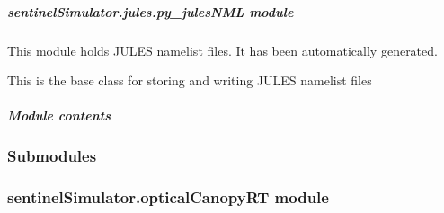 \documentclass[letterpaper,10pt,english]{sphinxmanual}
\begin{document}
\subparagraph{sentinelSimulator.jules.py\_julesNML module}
\label{source/sentinelSimulator.jules:module-sentinelSimulator.jules.py_julesNML}\label{source/sentinelSimulator.jules:sentinelsimulator-jules-py-julesnml-module}
This module holds JULES namelist files. 
It has been automatically generated.

\begin{fulllineitems}
\label{source/sentinelSimulator.jules:sentinelSimulator.jules.py_julesNML.julesNML}
This is the base class for storing
and writing JULES namelist files

\begin{fulllineitems}
\label{source/sentinelSimulator.jules:sentinelSimulator.jules.py_julesNML.julesNML.update}
\end{fulllineitems}


\begin{fulllineitems}
\label{source/sentinelSimulator.jules:sentinelSimulator.jules.py_julesNML.julesNML.write}
\end{fulllineitems}


\end{fulllineitems}



\subparagraph{Module contents}
\label{source/sentinelSimulator.jules:module-contents}\label{source/sentinelSimulator.jules:module-sentinelSimulator.jules}

\subsubsection{Submodules}
\label{source/sentinelSimulator:submodules}

\subsubsection{sentinelSimulator.opticalCanopyRT module}
\label{source/sentinelSimulator:sentinelsimulator-opticalcanopyrt-module}\label{source/sentinelSimulator:module-sentinelSimulator.opticalCanopyRT}
\end{document}
